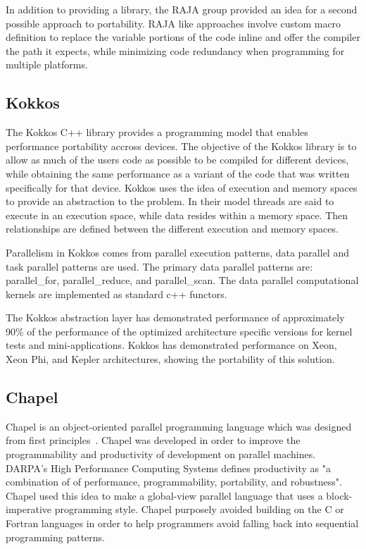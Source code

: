In addition to providing a library, the RAJA group provided an idea for a second possible approach to portability.
%
RAJA like approaches involve custom macro definition to replace the variable portions of the code inline and offer the compiler the path it expects, while minimizing code redundancy when programming for multiple platforms.

\subsection*{\textbf{Kokkos}}

The Kokkos C++ library provides a programming model that enables performance portability accross devices.
%
The objective of the Kokkos library is to allow as much of the users code as possible to be compiled for different devices, while obtaining the same performance as a variant of the code that was written specifically for that device.
%
Kokkos uses the idea of execution and memory spaces to provide an abstraction to the problem.
%
In their model threads are said to execute in an execution space, while data resides within a memory space.
%
Then relationships are defined between the different execution and memory spaces.
\cite{edwards2014kokkos}

Parallelism in Kokkos comes from parallel execution patterns, data parallel and task parallel patterns are used.
%
The primary data parallel patterns are: parallel\_for, parallel\_reduce, and parallel\_scan.
%
The data parallel computational kernels are implemented as standard c++ functors.
%

The Kokkos abstraction layer has demonstrated performance of approximately 90\% of the performance of the optimized architecture specific versions for kernel tests and mini-applications.
%
Kokkos has demonstrated performance on Xeon, Xeon Phi, and Kepler architectures, showing the portability of this solution.
\cite{edwards2014kokkos}
\cite{edwards2012manycore}

\subsection*{\textbf{Chapel}}

Chapel is an object-oriented parallel programming language which was designed from first principles~\cite{sidelnik2012performance}.
%
Chapel was developed in order to improve the programmability and productivity of development on parallel machines.
%
DARPA's High Performance Computing Systems defines productivity as "a combination of of performance, programmability, portability, and robustness".
~\cite{chamberlain2007parallel}
%
Chapel used this idea to make a global-view parallel language that uses a block-imperative programming style.
%
Chapel purposely avoided building on the C or Fortran languages in order to help programmers avoid falling back into sequential programming patterns.
%
\cite{chamberlain2007parallel}

